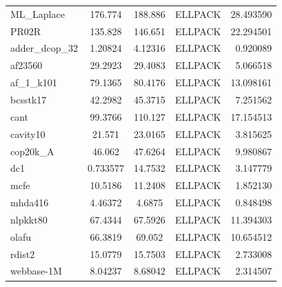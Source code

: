 \documentclass[12pt,oneside]{book} %
\begin{document}
\begin{longtable}{lcccr}
    ML\_Laplace       & 176.774      & 188.886          & ELLPACK                 & 28.493590        \\
    PR02R             & 135.828      & 146.651          & ELLPACK                 & 22.294501        \\
    adder\_dcop\_32   & 1.20824      & 4.12316          & ELLPACK                 & 0.920089         \\
    af23560           & 29.2923      & 29.4083          & ELLPACK                 & 5.066518         \\
    af\_1\_k101       & 79.1365      & 80.4176          & ELLPACK                 & 13.098161        \\
    bcsstk17          & 42.2982      & 45.3715          & ELLPACK                 & 7.251562         \\
    cant              & 99.3766      & 110.127          & ELLPACK                 & 17.154513        \\
    cavity10          & 21.571       & 23.0165          & ELLPACK                 & 3.815625         \\
    cop20k\_A         & 46.062       & 47.6264          & ELLPACK                 & 9.980867         \\
    dc1               & 0.733577     & 14.7532          & ELLPACK                 & 3.147779         \\
    mcfe              & 10.5186      & 11.2408          & ELLPACK                 & 1.852130         \\
    mhda416           & 4.46372      & 4.6875           & ELLPACK                 & 0.848498         \\
    nlpkkt80          & 67.4344      & 67.5926          & ELLPACK                 & 11.394303        \\
    olafu             & 66.3819      & 69.052           & ELLPACK                 & 10.654512        \\
    rdist2            & 15.0779      & 15.7503          & ELLPACK                 & 2.733008         \\
    webbase-1M        & 8.04237      & 8.68042          & ELLPACK                 & 2.314507         \\
\end{longtable}
\end{document}
